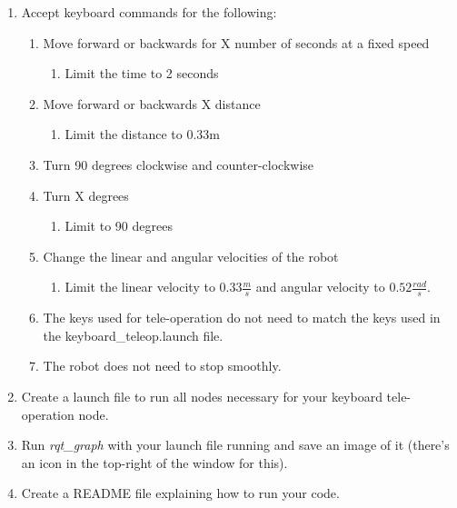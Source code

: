 \documentclass[12pt]{article}
\begin{document}
\begin{enumerate}
\item Accept keyboard commands for the following:
	\begin{enumerate}
	\item Move forward or backwards for X number of seconds at a fixed speed
	
		\begin{enumerate}
		\item Limit the time to 2 seconds
		\end{enumerate}
	
	\item Move forward or backwards X distance
	
		\begin{enumerate}
		\item Limit the distance to 0.33m
		\end{enumerate}
		
	\item Turn 90 degrees clockwise and counter-clockwise
	
	\item Turn X degrees
	
		\begin{enumerate}
		\item Limit to 90 degrees
		\end{enumerate}
		
	\item Change the linear and angular velocities of the robot
		\begin{enumerate}
		\item Limit the linear velocity to $0.33\frac{m}{s}$ and angular velocity to $0.52\frac{rad}{s}$.
		\end{enumerate}
		
	\item The keys used for tele-operation do not need to match the keys used in the keyboard\_teleop.launch file.
	\item The robot does not need to stop smoothly.
	\end{enumerate}
	
	\item Create a launch file to run all nodes necessary for your keyboard tele-operation node.
	
	\item Run \emph{rqt\_graph} with your launch file running and save an image of it (there's an icon in the top-right of the window for this).
	
	\item Create a README file explaining how to run your code.
	
\end{enumerate}
 
\end{document}
